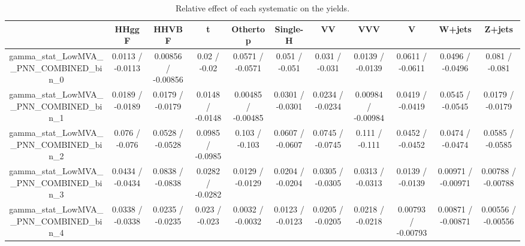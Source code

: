\documentclass[10pt]{article}
\begin{document}
\begin{table}[htbp]
\begin{center}
\begin{tabular}{|c|c|c|c|c|c|c|c|c|c|c|}
\hline 
      & HHggF      & HHVBF      & t      & Othertop      & Single-H      & VV      & VVV      & V      & W+jets      & Z+jets \\ 
\hline 
  gamma_stat_LowMVA__PNN_COMBINED_bin_0 & 0.0113 / -0.0113 & 0.00856 / -0.00856 & 0.02 / -0.02 & 0.0571 / -0.0571 & 0.051 / -0.051 & 0.031 / -0.031 & 0.0139 / -0.0139 & 0.0611 / -0.0611 & 0.0496 / -0.0496 & 0.081 / -0.081 \\ 
  gamma_stat_LowMVA__PNN_COMBINED_bin_1 & 0.0189 / -0.0189 & 0.0179 / -0.0179 & 0.0148 / -0.0148 & 0.00485 / -0.00485 & 0.0301 / -0.0301 & 0.0234 / -0.0234 & 0.00984 / -0.00984 & 0.0419 / -0.0419 & 0.0545 / -0.0545 & 0.0179 / -0.0179 \\ 
  gamma_stat_LowMVA__PNN_COMBINED_bin_2 & 0.076 / -0.076 & 0.0528 / -0.0528 & 0.0985 / -0.0985 & 0.103 / -0.103 & 0.0607 / -0.0607 & 0.0745 / -0.0745 & 0.111 / -0.111 & 0.0452 / -0.0452 & 0.0474 / -0.0474 & 0.0585 / -0.0585 \\ 
  gamma_stat_LowMVA__PNN_COMBINED_bin_3 & 0.0434 / -0.0434 & 0.0838 / -0.0838 & 0.0282 / -0.0282 & 0.0129 / -0.0129 & 0.0204 / -0.0204 & 0.0305 / -0.0305 & 0.0313 / -0.0313 & 0.0139 / -0.0139 & 0.00971 / -0.00971 & 0.00788 / -0.00788 \\ 
  gamma_stat_LowMVA__PNN_COMBINED_bin_4 & 0.0338 / -0.0338 & 0.0235 / -0.0235 & 0.023 / -0.023 & 0.0032 / -0.0032 & 0.0123 / -0.0123 & 0.0205 / -0.0205 & 0.0218 / -0.0218 & 0.00793 / -0.00793 & 0.00871 / -0.00871 & 0.00556 / -0.00556 \\ 
\hline 
\end{tabular} 
\caption{Relative effect of each systematic on the yields.} 
\end{center} 
\end{table} 
\end{document}
